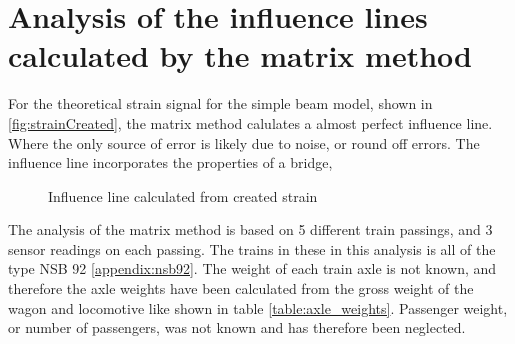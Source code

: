 \section{Analysis of the influence lines calculated by the matrix method}
For the theoretical strain signal for the simple beam model, shown in \ref{fig:strainCreated}, the matrix method calulates a almost perfect influence line. Where the only source of error is likely due to noise, or round off errors. The influence line incorporates the properties of a bridge,
\begin{figure}[htpb]
	\begin{adjustbox}{center}
		
	\end{adjustbox}
	\caption{Influence line calculated from created strain}
	\label{fig:inflCreated}
\end{figure}
The analysis of the matrix method is based on 5 different train passings, and 3 sensor readings on each passing. The trains in these in this analysis is all of the type NSB 92 \ref{appendix:nsb92}. The weight of each train axle is not known, and therefore the axle weights have been calculated from the gross weight of the wagon and locomotive like shown in table \ref{table:axle_weights}. Passenger weight, or number of passengers, was not known and has therefore been neglected.


